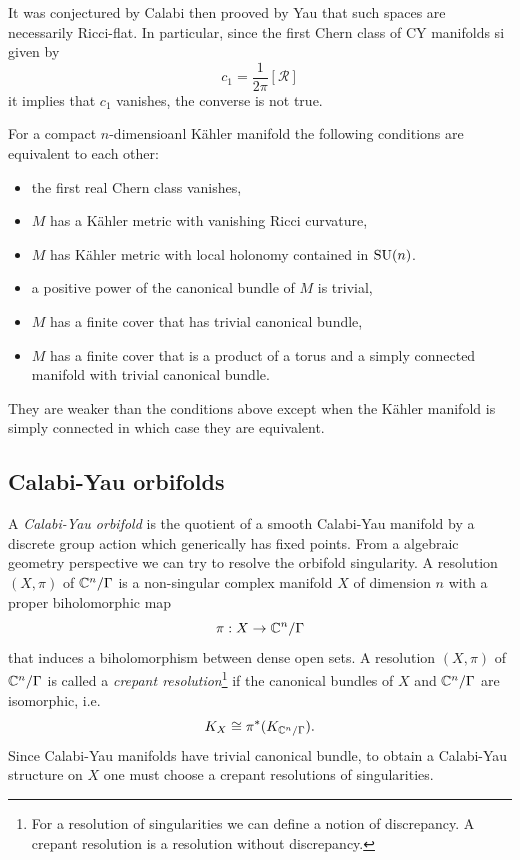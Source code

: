         It was conjectured by Calabi then prooved by Yau that such spaces are necessarily Ricci-flat. In particular, since the first Chern class of CY manifolds si given by
        \begin{equation}
            c_1=\frac{1}{2\pi}[\mathcal{R}]
        \end{equation}
        it implies that $c_1$ vanishes, the converse is not true.

        For a compact $n$-dimensioanl Kähler manifold the following conditions are equivalent to each other:
        \begin{itemize}
            \item the first real Chern class vanishes,
            \item $M$ has a Kähler metric with vanishing Ricci curvature,
            \item $M$ has Kähler metric with local holonomy contained in $\text{SU}(n)$.
            \item a positive power of the canonical bundle of $M$ is trivial,
            \item $M$ has a finite cover that has trivial canonical bundle,
            \item $M$ has a finite cover that is a product of a torus and a simply connected manifold with trivial canonical bundle.
        \end{itemize}
        They are weaker than the conditions above except when the Kähler manifold is simply connected in which case they are equivalent.

    \subsection{Calabi-Yau orbifolds}

        A \emph{Calabi-Yau orbifold} is the quotient of a smooth Calabi-Yau manifold by a discrete group action which generically has fixed points. From a algebraic geometry perspective we can try to resolve the orbifold singularity. A resolution $(X,\pi)$ of $\mathbb{C}^n/\Gamma$ is a non-singular complex manifold $X$ of dimension $n$ with a proper biholomorphic map 
        \begin{equation}
            \pi:X\to\mathbb{C}^n/\Gamma
        \end{equation}
        that induces a biholomorphism between dense open sets. A resolution $(X,\pi)$ of $\mathbb{C}^n/\Gamma$ is called a \emph{crepant resolution}\footnote{For a resolution of singularities we can define a notion of discrepancy. A crepant resolution is a resolution
            without discrepancy.} if the canonical bundles of $X$ and $\mathbb{C}^n/\Gamma$ are isomorphic, i.e.
            \begin{equation*}
                K_X\cong\pi^*(K_{\mathbb{C}^n/\Gamma}).
            \end{equation*}
        Since Calabi-Yau manifolds have trivial canonical bundle, to obtain a Calabi-Yau structure on $X$ one must choose a crepant resolutions of singularities.


